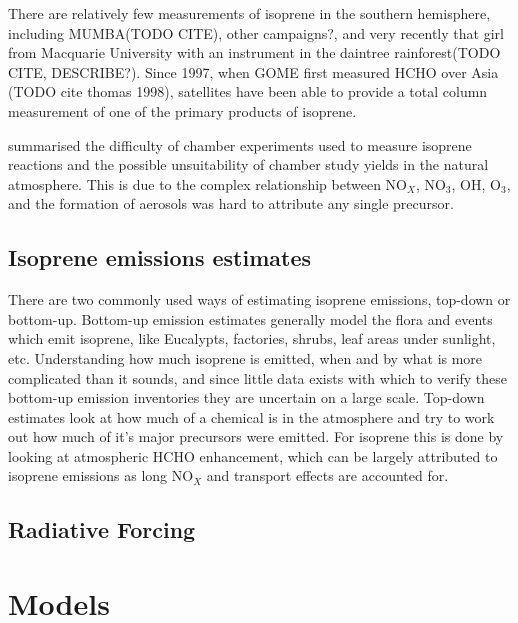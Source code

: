     There are relatively few measurements of isoprene in the southern hemisphere, including MUMBA(TODO CITE), other campaigns?, and very recently that girl from Macquarie University with an instrument in the daintree rainforest(TODO CITE, DESCRIBE?).
    Since 1997, when GOME first measured HCHO over Asia (TODO cite thomas 1998), satellites have been able to provide a total column measurement of one of the primary products of isoprene.
    
    \cite{Kanakidou2005} summarised the difficulty of chamber experiments used to measure isoprene reactions and the possible unsuitability of chamber study yields in the natural atmosphere.
    This is due to the complex relationship between NO$_X$, NO$_3$, OH, O$_3$, and the formation of aerosols was hard to attribute any single precursor.
    
    
  \subsection{Isoprene emissions estimates}
    There are two commonly used ways of estimating isoprene emissions, top-down or bottom-up.
    Bottom-up emission estimates generally model the flora and events which emit isoprene, like Eucalypts, factories, shrubs, leaf areas under sunlight, etc.
    Understanding how much isoprene is emitted, when and by what is more complicated than it sounds, and since little data exists with which to verify these bottom-up emission inventories they are uncertain on a large scale.
    Top-down estimates look at how much of a chemical is in the atmosphere and try to work out how much of it's major precursors were emitted.
    For isoprene this is done by looking at atmospheric HCHO enhancement, which can be largely attributed to isoprene emissions as long NO$_X$ and transport effects are accounted for.
  \subsection{Radiative Forcing}

    


\section{Models}
\label{ch_LitRev:sec:models}

